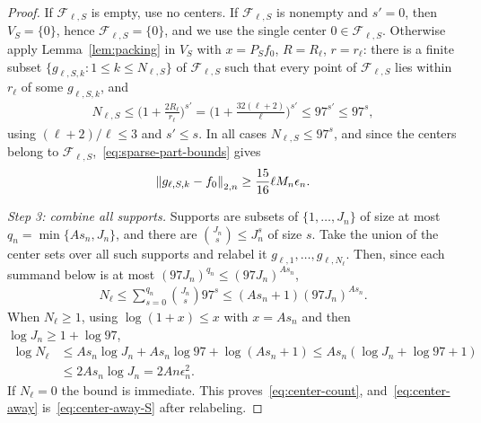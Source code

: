 \begin{proof}
If $\mathcal F_{\ell,S}$ is empty, use no centers. If $\mathcal F_{\ell,S}$ is nonempty and $s'=0$, then $V_S=\{0\}$, hence $\mathcal F_{\ell,S}=\{0\}$, and we use the single center $0\in\mathcal F_{\ell,S}$. Otherwise apply Lemma~\ref{lem:packing} in $V_S$ with $x=P_Sf_0$, $R=R_\ell$, $r=r_\ell$: there is a finite subset $\{g_{\ell,S,k}:1\leq k\leq N_{\ell,S}\}$ of $\mathcal F_{\ell,S}$ such that every point of $\mathcal F_{\ell,S}$ lies within $r_\ell$ of some $g_{\ell,S,k}$, and
\begin{align*}
N_{\ell,S}
\leq\Big(1+\frac{2R_\ell}{r_\ell}\Big)^{s'}
=\Big(1+\frac{32(\ell+2)}{\ell}\Big)^{s'}
\leq97^{s'}
\leq97^{s},
\end{align*}
using $(\ell+2)/\ell\leq3$ and $s'\leq s$. In all cases $N_{\ell,S}\leq97^s$, and since the centers belong to $\mathcal F_{\ell,S}$,~\eqref{eq:sparse-part-bounds} gives
\begin{align}
\left\lVert g_{\ell,S,k}-f_0 \right\rVert_{2,n}\geq\frac{15}{16}\ell M_n\epsilon_n .
\label{eq:center-away-S}
\end{align}

\smallskip\noindent\emph{Step 3: combine all supports.}
Supports are subsets of $\{1,\ldots,J_n\}$ of size at most $q_n=\min\{As_n,J_n\}$, and there are $\binom{J_n}{s}\leq J_n^s$ of size $s$. Take the union of the center sets over all such supports and relabel it $g_{\ell,1},\ldots,g_{\ell,N_\ell}$. Then, since each summand below is at most $(97J_n)^{q_n}\leq(97J_n)^{As_n}$,
\begin{align*}
N_\ell\leq\sum_{s=0}^{q_n}\binom{J_n}{s}97^s
\leq(As_n+1)(97J_n)^{As_n}.
\end{align*}
When $N_\ell\geq1$, using $\log(1+x)\leq x$ with $x=As_n$ and then $\log J_n\geq1+\log97$,
\begin{align*}
\log N_\ell
&\leq As_n\log J_n+As_n\log97+\log(As_n+1)
\leq As_n(\log J_n+\log97+1)\\
&\leq2As_n\log J_n
=2An\epsilon_n^2 .
\end{align*}
If $N_\ell=0$ the bound is immediate. This proves~\eqref{eq:center-count}, and~\eqref{eq:center-away} is~\eqref{eq:center-away-S} after relabeling.


\end{proof}
